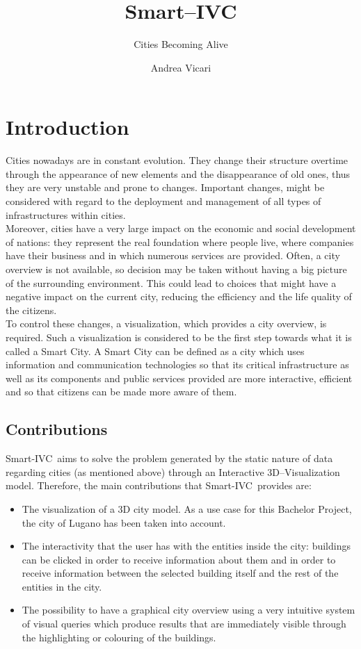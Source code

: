 \documentclass[]{usiinfbachelorproject}
\author{Andrea Vicari}
\title{Smart--IVC}
\subtitle{Cities Becoming Alive}
\newcommand{\applicationName}{Smart-IVC}
\begin{document}
\maketitle

\section{Introduction} \label{introduction}
Cities nowadays are in constant evolution. They change their structure overtime through the appearance of new elements and the disappearance of old ones, thus they are very unstable and prone to changes. Important changes, might be considered with regard to the deployment and management of all types of infrastructures within cities.\\

Moreover, cities have a very large impact on the economic and social development of nations: they represent the real foundation where people live, where companies have their business and in which numerous services are provided. Often, a city overview is not available, so decision may be taken without having a big picture of the surrounding environment. This could lead to choices that might have a negative impact on the current city, reducing the efficiency and the life quality of the citizens.\\

To control these changes, a visualization, which provides a city overview, is required. Such a visualization is considered to be the first step towards what it is called a Smart City. A Smart City can be defined as a city which uses information and communication technologies so that its critical infrastructure as well as its components and public services provided are more interactive, efficient and so that citizens can be made more aware of them.
\subsection{Contributions}
\applicationName\ aims to solve the problem generated by the static nature of data regarding cities (as mentioned above) through an Interactive 3D--Visualization model. Therefore, the main contributions that \applicationName\ provides are:
\begin{itemize}
	\item The visualization of a 3D city model. As a use case for this Bachelor Project, the city of Lugano has been taken into account.
	\item The interactivity that the user has with the entities inside the city: buildings can be clicked in order to receive information about them and in order to receive information between the selected building itself and the rest of the entities in the city.
	\item The possibility to have a graphical city overview using a very intuitive system of visual queries which produce results that are immediately visible through the highlighting or colouring of the buildings. 
\end{itemize} 
\end{document}
